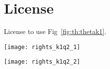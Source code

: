 \appendix
\chapter{License}
%
License to use Fig~\ref{fig:th:thetak1}.

\texttt{[image: rights\_k1q2\_1]}

\texttt{[image: rights\_k1q2\_2]}
